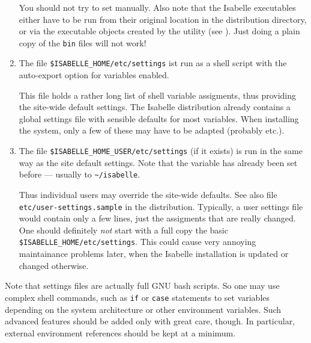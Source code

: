 \begin{isabellebody}
\begin{isamarkuptext}
\begin{enumerate}
  You should not try to set \hyperlink{setting.ISABELLE-HOME}{\mbox{}} manually. Also
  note that the Isabelle executables either have to be run from their
  original location in the distribution directory, or via the
  executable objects created by the \hyperlink{tool.install}{\mbox{}} utility (see
  ).  Just doing a plain copy of the
  \verb|bin| files will not work!
  
  \item The file \verb|$ISABELLE_HOME/etc/settings| ist run as
  a shell script with the auto-export option for variables enabled.
  
  This file holds a rather long list of shell variable assigments,
  thus providing the site-wide default settings.  The Isabelle
  distribution already contains a global settings file with sensible
  defaults for most variables.  When installing the system, only a few
  of these may have to be adapted (probably \hyperlink{setting.ML-SYSTEM}{\mbox{}}
  etc.).
  
  \item The file \verb|$ISABELLE_HOME_USER/etc/settings| (if it
  exists) is run in the same way as the site default settings. Note
  that the variable \hyperlink{setting.ISABELLE-HOME-USER}{\mbox{}} has already been set
  before --- usually to \verb|~/isabelle|.
  
  Thus individual users may override the site-wide defaults.  See also
  file \verb|etc/user-settings.sample| in the distribution.
  Typically, a user settings file would contain only a few lines, just
  the assigments that are really changed.  One should definitely
  \emph{not} start with a full copy the basic \verb|$ISABELLE_HOME/etc/settings|. This could cause very annoying
  maintainance problems later, when the Isabelle installation is
  updated or changed otherwise.
  
  \end{enumerate}

  Note that settings files are actually full GNU bash scripts. So one
  may use complex shell commands, such as \verb|if| or
  \verb|case| statements to set variables depending on the
  system architecture or other environment variables.  Such advanced
  features should be added only with great care, though. In
  particular, external environment references should be kept at a
  minimum.


\end{isamarkuptext}
\end{isabellebody}
